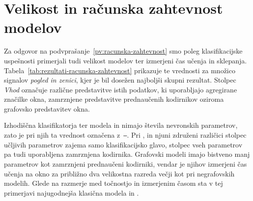 \section{Velikost in računska zahtevnost modelov}
\label{subsec:rezultati-racunska-zahtevnost}

Za odgovor na podvprašanje~\ref{pv:racunska-zahtevnost} smo poleg klasifikacijske uspešnosti primerjali tudi velikost modelov ter izmerjeni čas učenja in sklepanja.
Tabela~\ref{tab:rezultati-racunska-zahtevnost} prikazuje te vrednosti za množico signalov \emph{pogled in zenici}, kjer je bil dosežen najboljši skupni rezultat.
Stolpec \emph{Vhod} označuje različne predstavitve istih podatkov, ki uporabljajo agregirane značilke okna, zamrznjene predstavitve prednaučenih kodirnikov oziroma grafovsko predstavitev okna.

Izhodiščna klasifikatorja ter modela  in  nimajo števila nevronskih parametrov, zato je pri njih ta vrednost označena z~\texttt{--}.
Pri ,  in njuni združeni različici stolpec učljivih parametrov zajema samo klasifikacijsko glavo, stolpec vseh parametrov pa tudi uporabljena zamrznjena kodirnika.
Grafovski modeli imajo bistveno manj parametrov kot zamrznjeni prednaučeni kodirniki, vendar je njihov izmerjeni čas učenja na okno za približno dva velikostna razreda večji kot pri negrafovskih modelih.
Glede na razmerje med točnostjo in izmerjenim časom sta v tej primerjavi najugodnejša klasična modela  in .


